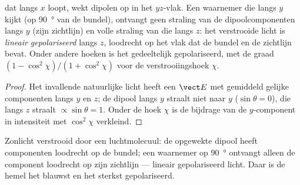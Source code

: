 \begin{proposition}\label{prop:b2:dipole-radiation:polarization}
 dat langs $x$ loopt, wekt dipolen op in het $yz$-vlak. Een
waarnemer die langs $y$ kijkt (op \qty{90}{\degree} van de bundel), ontvangt
geen straling van de dipoolcomponenten langs $y$ (zijn zichtlijn) en volle
straling van die langs $z$: het verstrooide licht is \emph{lineair
gepolariseerd} langs $z$, loodrecht op het vlak dat de bundel en de
zichtlijn bevat. Onder andere hoeken is het gedeeltelijk gepolariseerd, met
de graad $(1 - \cos^2\chi)/(1 + \cos^2\chi)$ voor de verstrooiingshoek
$\chi$.
\end{proposition}

\begin{proof}
Het invallende natuurlijke licht heeft een $\vect E$ met gemiddeld gelijke
componenten langs $y$ en $z$; de dipool langs $y$ straalt niet naar $y$
($\sin
\theta = 0$), die langs $z$ straalt $\propto\sin\theta = 1$. Onder de
hoek $\chi$ is de bijdrage van de $y$-component in intensiteit met
$\cos^2\chi$ verkleind.
\end{proof}

\begin{omfigure}

{\small Zonlicht verstrooid door een luchtmolecuul: de opgewekte dipool
heeft componenten loodrecht op de bundel; een waarnemer op \qty{90}{\degree}
ontvangt alleen de component loodrecht op zijn zichtlijn --- lineair
gepolariseerd licht. Daar is de hemel het blauwst en het sterkst
gepolariseerd.}
\end{omfigure}

